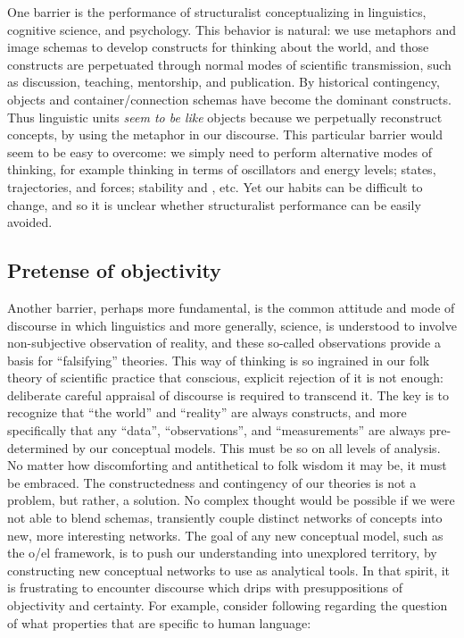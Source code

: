 One barrier is the performance of structuralist conceptualizing in linguistics, cognitive science, and psychology. This behavior is natural: we use metaphors and image schemas to develop constructs for thinking about the world, and those constructs are perpetuated through normal modes of scientific transmission, such as discussion, teaching, mentorship, and publication. By historical contingency, objects and container/connection schemas have become the dominant constructs. Thus linguistic units \textit{seem to be like} objects because we perpetually reconstruct  concepts, by using the metaphor in our discourse. This particular barrier would seem to be easy to overcome: we simply need to perform alternative modes of thinking, for example thinking in terms of oscillators and energy levels; states, trajectories, and forces; stability and , etc. Yet our habits can be difficult to change, and so it is unclear whether structuralist performance can be easily avoided. 

\subsection{Pretense of objectivity}

Another barrier, perhaps more fundamental, is the common attitude and mode of discourse in which linguistics and more generally, science, is understood to involve non-subjective observation of reality, and these so-called observations provide a basis for “falsifying” theories. This way of thinking is so ingrained in our folk theory of scientific practice that conscious, explicit rejection of it is not enough: deliberate careful appraisal of discourse is required to transcend it. The key is to recognize that “the world” and “reality” are always constructs, and more specifically that any “data”, “observations”, and “measurements” are always pre-determined by our conceptual models. This must be so on all levels of analysis. No matter how discomforting and antithetical to folk wisdom it may be, it must be embraced. The constructedness and contingency of our theories is not a problem, but rather, a solution. No complex thought would be possible if we were not able to blend schemas, transiently couple distinct networks of concepts into new, more interesting networks. The goal of any new conceptual model, such as the o/el framework, is to push our understanding into unexplored territory, by constructing new conceptual networks to use as analytical tools. In that spirit, it is frustrating to encounter discourse which drips with presuppositions of objectivity and certainty. For example, consider following regarding the question of what properties that are specific to human language:

